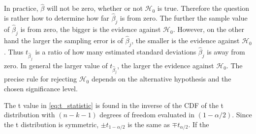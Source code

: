In practice, $\hat{\beta}$ will not be zero, whether or not $\mathcal{H}_0$ is true. Therefore the question is rather how to determine how far $\hat{\beta}_j$ is from zero. The further the sample value of $\hat{\beta}_j$ is from zero, the bigger is the evidence against $\mathcal{H}_0$. 
However, on the other hand the larger the sampling error is of $\hat{\beta}_j$, the smaller is the evidence against $\mathcal{H}_0$. Thus $t_{\hat{\beta}_j}$ is a ratio of how many estimated standard deviations $\hat{\beta}_j$ is away from zero.
In general the larger value of $t_{\hat{\beta}_j}$, the larger the evidence against $\mathcal{H}_0$. 
The precise rule for rejecting $\mathcal{H}_0$ depends on the alternative hypothesis and the chosen significance level.

The t value in \eqref{eq:t_statistic} is found in the inverse of the CDF of the t distribution with $(n - k - 1)$ degrees of freedom evaluated in $(1-\alpha/2)$. 
Since the t distribution is symmetric, $\pm t_{1-\alpha/2}$ is the same as $\mp t_{\alpha/2}$.
If the 

